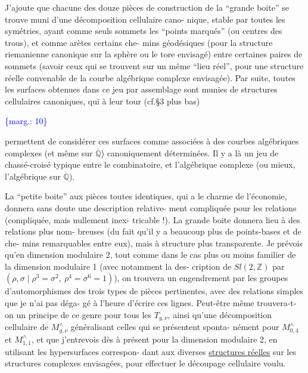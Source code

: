 \documentclass[11pt]{article}
\newcommand{\scanpage}[1]{\par\bigskip\noindent{\small\sffamily[scan #1]}\par}
\newcommand{\mspage}[1]{{\small\sffamily[p.\,#1]}}
\newcommand{\margin}[1]{\textcolor{blue}{\{\textsf{marg.:} #1\}}}
\newcommand{\uline}[1]{\underline{#1}}
\begin{document}
J'ajoute que chacune des douze pièces de construction de
la ``grande boite'' se trouve muni d'une décomposition cellulaire cano-%
nique, stable par toutes les symétries, ayant comme seuls sommets les
``points marqués'' (ou centres des trous), et comme arètes certains che-%
mins géodésiques (pour la structure riemanienne canonique sur la sphère
ou le tore envisagé) entre certaines paires de sommets (savoir ceux
qui se trouvent sur un même ``lieu réel'', pour une structure réelle
convenable de la courbe algébrique complexe envisagée). Par suite,
toutes les surfaces obtenues dans ce jeu par assemblage sont munies
de structures cellulaires canoniques, qui à leur tour (cf.§3 plus bas)

\margin{10}

\clearpage
\scanpage{119/11}
\mspage{9}

permettent de considérer ces surfaces comme associées à des courbes
algébriques complexes (et même sur $\overline{\mathbb{Q}}$) canoniquement déterminées.
Il y a là un jeu de chassé-croisé typique entre le combinatoire,
et l'algébrique complexe (ou mieux, l'algébrique sur $\overline{\mathbb{Q}}$).

La ``petite boite'' aux pièces toutes identiques, qui a le
charme de l'économie, donnera sans doute une description relative-%
ment compliquée pour les relations (compliquée, mais nullement inex-%
tricable !). La grande boite donnera lieu à des relations plus nom-%
breuses (du fait qu'il y a beaucoup plus de points-bases et de che-%
mins remarquables entre eux), mais à structure plus transparente. Je
prévois qu'en dimension modulaire 2, tout comme dans le cas plus ou
moins familier de la dimension modulaire 1 (avec notamment la des-%
cription de $Sl(2,\mathbb{Z})$ par $(\rho,\sigma \mid \rho^3 = \sigma^2,\ \rho^4 = \sigma^6 = 1)$), on trouvera
un engendrement par les groupes d'automorphismes des trois types de
pièces pertinentes, avec des relations simples que je n'ai pas déga-%
gé à l'heure d'écrire ces lignes. Peut-être même trouvera-t-on un
principe de ce genre pour tous les $T_{g,\nu}$, ainsi qu'une décomposition
cellulaire de $M^{\wedge}_{g,\nu}$ généralisant celles qui se présentent sponta-%
nément pour $M^{\wedge}_{0,4}$ et $M^{\wedge}_{1,1}$, et que j'entrevois dès à présent pour
la dimension modulaire 2, en utilisant les hypersurfaces correspon-%
dant aux diverses \uline{structures réelles} sur les structures complexes
envisagées, pour effectuer le découpage cellulaire voulu.
\end{document}
